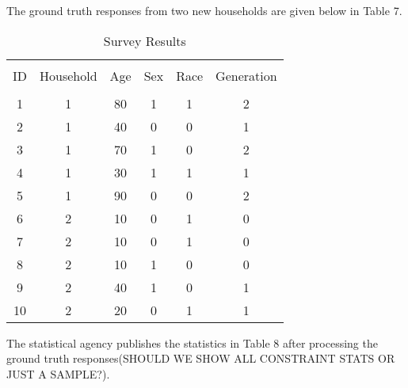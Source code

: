 \documentclass[jou,apacite]{apa6}
\begin{document}
The ground truth responses from two new households are given below in Table 7.
\begin{table}[!htb]
\caption{Survey Results}\label{tab7}
\begin{tabular}{c|c|c|c|c|c}
\hline\\[-1.5ex]
ID & Household & Age & Sex & Race & Generation \\[0.5ex]
\hline\\[-1.5ex]
1 & 1 & 80 & 1 & 1 & 2  \\[0.5ex]
2 & 1 & 40 & 0 & 0 & 1  \\[0.5ex]
3 & 1 & 70 & 1 & 0 & 2  \\[0.5ex]
4 & 1 & 30 & 1 & 1 & 1  \\[0.5ex]
5 & 1 & 90 & 0 & 0 & 2  \\[0.5ex]
6 & 2 & 10 & 0 & 1 & 0  \\[0.5ex]
7 & 2 & 10 & 0 & 1 & 0  \\[0.5ex]
8 & 2 & 10 & 1 & 0 & 0  \\[0.5ex]
9 & 2 & 40 & 1 & 0 & 1 \\[0.5ex]
10 & 2 & 20 & 0 & 1 & 1 \\[0.5ex]
\hline
\end{tabular}
\end{table}

The statistical agency publishes the statistics in Table 8 after processing the ground truth responses(SHOULD WE SHOW ALL CONSTRAINT STATS OR JUST A SAMPLE?).
\end{document}
